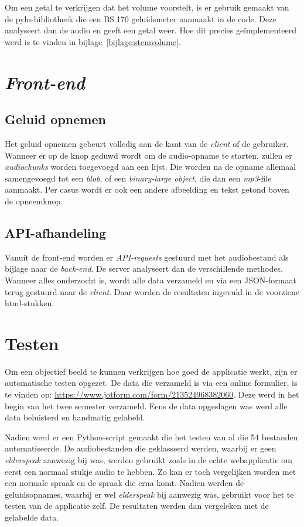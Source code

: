 Om een getal te verkrijgen dat het volume voorstelt, is er gebruik gemaakt van de pyln-bibliotheek die een BS.170 geluidsmeter aanmaakt in de code. Deze analyseert dan de audio en geeft een getal weer. Hoe dit precies geïmplementeerd werd is te vinden in bijlage~\ref{bijlage:stemvolume}.

\section{\textit{Front-end}}
\subsection{Geluid opnemen}
Het geluid opnemen gebeurt volledig aan de kant van de \textit{client} of de gebruiker. Wanneer er op de knop geduwd wordt om de audio-opname te starten, zullen er \textit{audiochunks } worden toegevoegd aan een lijst. Die worden na de opname allemaal samengevoegd tot een \textit{blob}, of een \textit{binary-large object}, die dan een \textit{mp3}-file aanmaakt.
Per casus wordt er ook een andere afbeelding en tekst getond boven de opneemknop.

\subsection{API-afhandeling}
Vanuit de front-end worden er \textit{API-requests} gestuurd met het audiobestand als bijlage naar de \textit{back-end}. De server analyseert dan de verschillende methodes. Wanneer alles onderzocht is, wordt alle data verzameld en via een JSON-formaat terug gestuurd naar de \textit{client}. Daar worden de resultaten ingevuld in de voorziene html-stukken.

\section{Testen}
Om een objectief beeld te kunnen verkrijgen hoe goed de applicatie werkt, zijn er automatische testen opgezet. De data die verzameld is via een online formulier, is te vinden op:  \url{https://www.jotform.com/form/213524968382060}. Deze werd in het begin van het twee semester verzameld. Eens de data opgeslagen was werd alle data beluisterd en handmatig gelabeld.

Nadien werd er een Python-script gemaakt die het testen van al die 54 bestanden automatiseerde. De audiobestanden die geklasseerd werden, waarbij er geen \textit{elderspeak} aanwezig bij was, werden gebruikt zoals in de echte webapplicatie om eerst een normaal stukje audio te hebben. Zo kan er toch vergelijken worden met een normale spraak en de spraak die erna komt. Nadien werden de geluidsopnames,  waarbij er wel \textit{elderspeak} bij aanwezig was, gebruikt voor het te testen van de applicatie zelf. De resultaten werden dan vergeleken met de gelabelde data.


